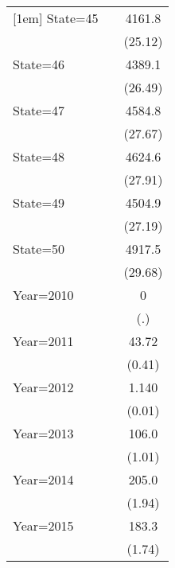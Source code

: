 {\begin{longtable}{l*{2}{c}}
[1em]
State=45            &                     &      4161.8\sym{***}\\
                    &                     &     (25.12)         \\
[1em]
State=46            &                     &      4389.1\sym{***}\\
                    &                     &     (26.49)         \\
[1em]
State=47            &                     &      4584.8\sym{***}\\
                    &                     &     (27.67)         \\
[1em]
State=48            &                     &      4624.6\sym{***}\\
                    &                     &     (27.91)         \\
[1em]
State=49            &                     &      4504.9\sym{***}\\
                    &                     &     (27.19)         \\
[1em]
State=50            &                     &      4917.5\sym{***}\\
                    &                     &     (29.68)         \\
[1em]
Year=2010           &                     &           0         \\
                    &                     &         (.)         \\
[1em]
Year=2011           &                     &       43.72         \\
                    &                     &      (0.41)         \\
[1em]
Year=2012           &                     &       1.140         \\
                    &                     &      (0.01)         \\
[1em]
Year=2013           &                     &       106.0         \\
                    &                     &      (1.01)         \\
[1em]
Year=2014           &                     &       205.0         \\
                    &                     &      (1.94)         \\
[1em]
Year=2015           &                     &       183.3         \\
                    &                     &      (1.74)         \\

\end{longtable}}
